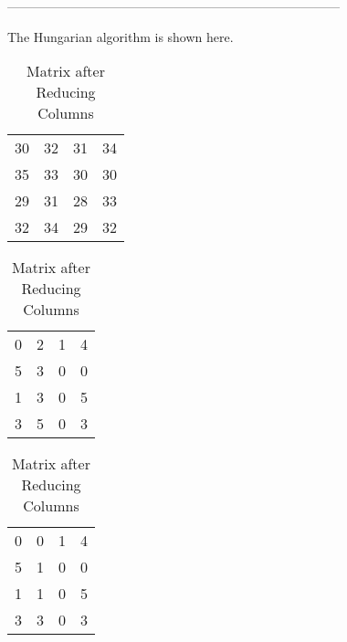 ------------------------------------------------------------------------------
% 
%
%

\begin{subquestions}
	
	\subquestion
	
	\begin{subsubquestions}
		
		\subsubquestion
		
		The Hungarian algorithm is shown here.
		
		\begin{table}[!hbt]
			\begin{minipage}{0.3\textwidth}
				\centering
				\begin{tabular}{cccc}
					30 & 32 & 31 & 34 \\
					35 & 33 & 30 & 30 \\
					29 & 31 & 28 & 33 \\
					32 & 34 & 29 & 32 \\
				\end{tabular}
				\captionsetup{width=1.1\linewidth}
				\caption*{Matrix From question}
			\end{minipage}
			\hspace{20pt}
			\begin{minipage}{0.3\textwidth}
				\centering
				\begin{tabular}{cccc}
					0 & 2 & 1 & 4 \\
					5 & 3 & 0 & 0 \\
					1 & 3 & 0 & 5 \\
					3 & 5 & 0 & 3 \\
				\end{tabular}
				\captionsetup{width=1.1\linewidth}
				\caption*{Matrix after Reducing Rows}
			\end{minipage}
			\hspace{20pt}
			\begin{minipage}{0.3\textwidth}
				\centering
				\begin{tabular}{cccc}
					0 & 0 & 1 & 4 \\
					5 & 1 & 0 & 0 \\
					1 & 1 & 0 & 5 \\
					3 & 3 & 0 & 3 \\
				\end{tabular}
				\captionsetup{width=1.1\linewidth}
				\caption*{Matrix after Reducing Columns} 
			\end{minipage}
			

\end{table}
\end{subsubquestions}
\end{subquestions}
